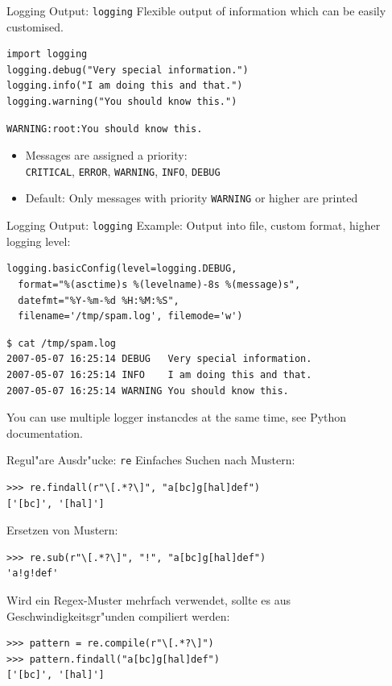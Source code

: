 \begin{frame}[fragile]{Logging Output: \texttt{logging}}
Flexible output of information which can be easily customised.
\begin{lstlisting}[style=Python]
import logging
logging.debug("Very special information.")
logging.info("I am doing this and that.")
logging.warning("You should know this.")
\end{lstlisting}
\begin{lstlisting}[style=shell]
WARNING:root:You should know this.
\end{lstlisting}
\begin{itemize}
\item Messages are assigned a priority:\\
 \texttt{CRITICAL}, \texttt{ERROR}, \texttt{WARNING}, \texttt{INFO}, \texttt{DEBUG}
\item Default: Only messages with priority \texttt{WARNING} or higher are printed
\end{itemize}
\end{frame}

\begin{frame}[fragile]{Logging Output: \texttt{logging}}
Example: Output into file, custom format, higher logging level:
\begin{lstlisting}[style=Python, basicstyle=\ttfamily\small]
logging.basicConfig(level=logging.DEBUG,
  format="%(asctime)s %(levelname)-8s %(message)s",
  datefmt="%Y-%m-%d %H:%M:%S",
  filename='/tmp/spam.log', filemode='w')
\end{lstlisting}
\begin{lstlisting}[style=Shell, basicstyle=\ttfamily\small]
$ cat /tmp/spam.log
2007-05-07 16:25:14 DEBUG   Very special information.
2007-05-07 16:25:14 INFO    I am doing this and that.
2007-05-07 16:25:14 WARNING You should know this.
\end{lstlisting} %
You can use multiple logger instancdes at the same time, see Python documentation.
\end{frame}

\begin{frame}[fragile]{Regul"are Ausdr"ucke: \texttt{re}}
Einfaches Suchen nach Mustern:
\begin{lstlisting}[style=Shell]
>>> re.findall(r"\[.*?\]", "a[bc]g[hal]def")
['[bc]', '[hal]']
\end{lstlisting}
\vspace*{2mm}
Ersetzen von Mustern:
\begin{lstlisting}[style=Shell]
>>> re.sub(r"\[.*?\]", "!", "a[bc]g[hal]def")
'a!g!def'
\end{lstlisting}
\vspace*{2mm}
Wird ein Regex-Muster mehrfach verwendet, sollte es aus Geschwindigkeitsgr"unden compiliert werden:
\begin{lstlisting}[style=Shell]
>>> pattern = re.compile(r"\[.*?\]")
>>> pattern.findall("a[bc]g[hal]def")
['[bc]', '[hal]']
\end{lstlisting}
\end{frame}

